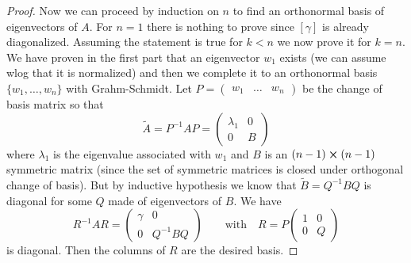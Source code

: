 \documentclass[12pt]{extarticle}
\numberwithin{equation}{subsection}
\begin{document}
\begin{proof}
	Now we can proceed by induction on $n$ to find an orthonormal basis of eigenvectors of $A$.
	For $n = 1$ there is nothing to prove since $[\gamma]$ is already diagonalized.
	Assuming the statement is true for $k < n$ we now prove it for $k = n$.
	We have proven in the first part that an eigenvector $w_1$ exists (we can assume wlog that it is
	normalized) and then we complete it to an orthonormal basis $\{ w_1, \dots, w_n \}$
	with Grahm-Schmidt.
	Let $P = \begin{pmatrix} w_1 & \dots & w_n \end{pmatrix}$ be the change of basis matrix so that
	\begin{equation}
		\tilde A = P^{-1} A P = \begin{pmatrix}
			\lambda_1 & 0 \\
			0         & B
		\end{pmatrix}
	\end{equation}
	where $\lambda_1$ is the eigenvalue associated with $w_1$ and $B$ is an $(n-1)\cross (n-1)$
	symmetric matrix (since the set of symmetric matrices is closed under orthogonal change of
	basis).
	But by inductive hypothesis we know that $\tilde B = Q^{-1} B Q$ is diagonal for some $Q$ made of
	eigenvectors of $B$.
	We have
	\begin{equation}
		R^{-1} A R = \begin{pmatrix}
			\gamma & 0          \\
			0      & Q^{-1} B Q
		\end{pmatrix}
		\qquad \text{with} \quad
		R = P \begin{pmatrix}
			1 & 0 \\
			0 & Q
		\end{pmatrix}
	\end{equation}
	is diagonal. Then the columns of $R$ are the desired basis.
\end{proof}
\end{document}
